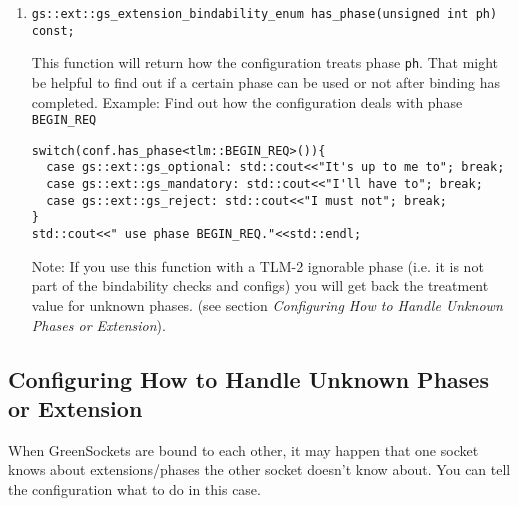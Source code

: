 \documentclass[a4paper,10pt]{article}          %
\begin{document}
\begin{enumerate}
\item
\verb|gs::ext::gs_extension_bindability_enum has_phase(unsigned int ph) const;|

This function will return how the configuration treats phase \verb|ph|. That might be helpful to find out if a certain phase can be used or not after binding has completed. Example: Find out how the configuration deals with phase \verb|BEGIN_REQ|

\begin{small}
\begin{verbatim}
switch(conf.has_phase<tlm::BEGIN_REQ>()){
  case gs::ext::gs_optional: std::cout<<"It's up to me to"; break;
  case gs::ext::gs_mandatory: std::cout<<"I'll have to"; break;
  case gs::ext::gs_reject: std::cout<<"I must not"; break;
}
std::cout<<" use phase BEGIN_REQ."<<std::endl;
\end{verbatim}
\end{small}

Note: If you use this function with a TLM-2 ignorable phase (i.e. it is not part of the bindability checks and configs) you will get back the treatment value for unknown phases. (see section \emph{Configuring How to Handle Unknown Phases or Extension}).


\end{enumerate}

\subsection{Configuring How to Handle Unknown Phases or Extension}

When GreenSockets are bound to each other, it may happen that one socket knows about extensions/phases the other socket doesn't know about. You can tell the configuration what to do in this case.
\end{document}
